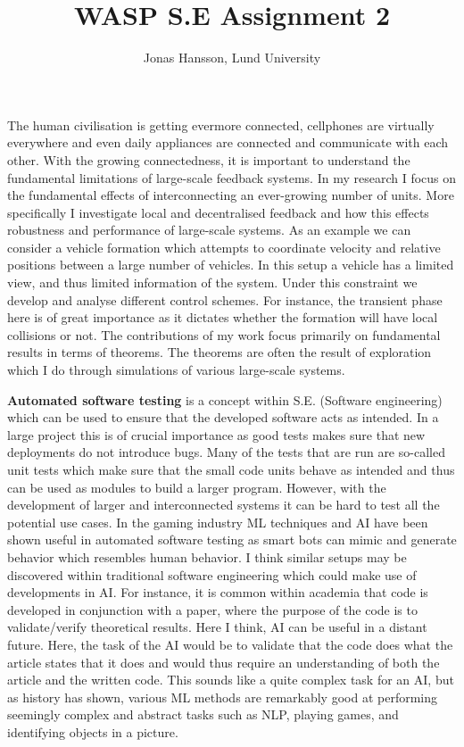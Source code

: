 \documentclass[11pt]{article}
\title{\vspace{-4.0cm} WASP S.E Assignment 2}
\author{Jonas Hansson, Lund University}
\begin{document}
\maketitle

The human civilisation is getting evermore connected, cellphones are virtually everywhere and even daily appliances are connected and communicate with each other. With the growing connectedness, it is important to understand the fundamental limitations of large-scale feedback systems. In my research I focus on the fundamental effects of interconnecting an ever-growing number of units. More specifically I investigate local and decentralised feedback and how this effects robustness and performance of large-scale systems. As an example we can consider a vehicle formation which attempts to coordinate velocity and relative positions between a large number of vehicles. In this setup a vehicle has a limited view, and thus limited information of the system. Under this constraint we develop and analyse different control schemes. For instance, the transient phase here is of great importance as it dictates whether the formation will have local collisions or not. The contributions of my work focus primarily on fundamental results in terms of theorems. The theorems are often the result of exploration which I do through simulations of various large-scale systems.


\textbf{Automated software testing} is a concept within S.E. (Software engineering) which can be used to ensure that the developed software acts as intended. In a large project this is of crucial importance as good tests makes sure that new deployments do not introduce bugs. Many of the tests that are run are so-called unit tests which make sure that the small code units behave as intended and thus can be used as modules to build a larger program. However, with the development of larger and interconnected systems it can be hard to test all the potential use cases. In the gaming industry ML techniques and AI have been shown useful in automated software testing as smart bots can mimic and generate behavior which resembles human behavior. I think similar setups may be discovered within traditional software engineering which could make use of developments in AI. For instance, it is common within academia that code is developed in conjunction with a paper, where the purpose of the code is to validate/verify theoretical results. Here I think, AI can be useful in a distant future. Here, the task of the AI would be to validate that the code does what the article states that it does and would thus require an understanding of both the article and the written code. This sounds like a quite complex task for an AI, but as history has shown, various ML methods are remarkably good at performing seemingly complex and abstract tasks such as NLP, playing games, and identifying objects in a picture. 
\end{document}
